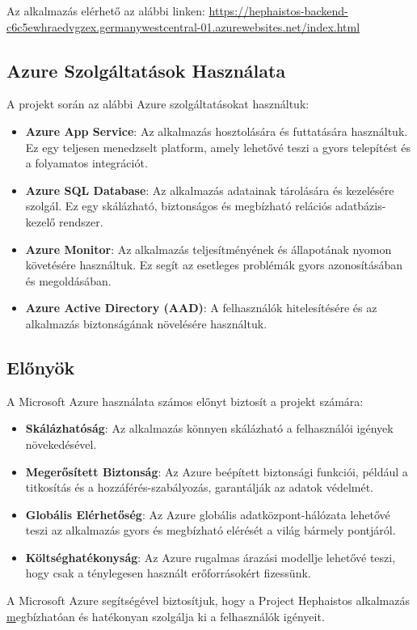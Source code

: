 \documentclass[colorlinks]{thesis-kando}
\theoremstyle{definition}
\theoremstyle{remark}
\begin{document}
Az alkalmazás elérhető az alábbi linken:
\url{https://hephaistos-backend-c6c5ewhraedvgzex.germanywestcentral-01.azurewebsites.net/index.html}

\subsection*{Azure Szolgáltatások Használata}
A projekt során az alábbi Azure szolgáltatásokat használtuk:
\begin{itemize}
    \item \textbf{Azure App Service}: Az alkalmazás hosztolására és futtatására használtuk. Ez egy teljesen menedzselt platform, amely lehetővé teszi a gyors telepítést és a folyamatos integrációt.
    \item \textbf{Azure SQL Database}: Az alkalmazás adatainak tárolására és kezelésére szolgál. Ez egy skálázható, biztonságos és megbízható relációs adatbázis-kezelő rendszer.
    \item \textbf{Azure Monitor}: Az alkalmazás teljesítményének és állapotának nyomon követésére használtuk. Ez segít az esetleges problémák gyors azonosításában és megoldásában.
    \item \textbf{Azure Active Directory (AAD)}: A felhasználók hitelesítésére és az alkalmazás biztonságának növelésére használtuk.
\end{itemize}

\subsection*{Előnyök}
A Microsoft Azure használata számos előnyt biztosít a projekt számára:
\begin{itemize}
    \item \textbf{Skálázhatóság}: Az alkalmazás könnyen skálázható a felhasználói igények növekedésével.
    \item \textbf{Megerősített Biztonság}: Az Azure beépített biztonsági funkciói, például a titkosítás és a hozzáférés-szabályozás, garantálják az adatok védelmét.
    \item \textbf{Globális Elérhetőség}: Az Azure globális adatközpont-hálózata lehetővé teszi az alkalmazás gyors és megbízható elérését a világ bármely pontjáról.
    \item \textbf{Költséghatékonyság}: Az Azure rugalmas árazási modellje lehetővé teszi, hogy csak a ténylegesen használt erőforrásokért fizessünk.
\end{itemize}

A Microsoft Azure segítségével biztosítjuk, hogy a Project Hephaistos alkalmazás \href{https://projecthephaistos.azurewebsites.net/index.html} megbízhatóan és hatékonyan szolgálja ki a felhasználók igényeit.
\end{document}
